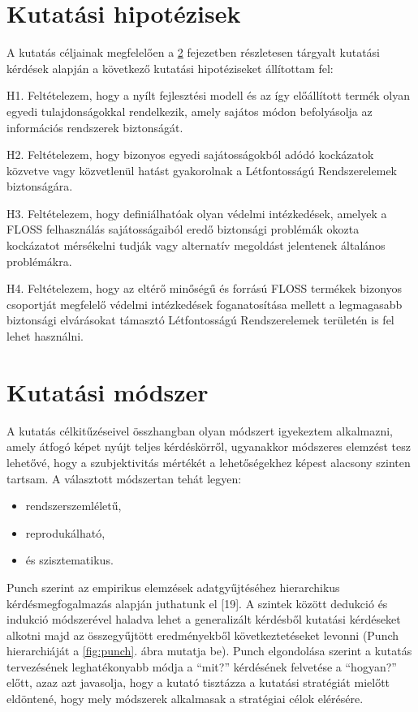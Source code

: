 \documentclass[12pt,magyar,a4paper,oneside]{scrreprt}
\providecommand{\tightlist}{%
  \setlength{\itemsep}{0pt}\setlength{\parskip}{0pt}}
\begin{document}
\hypertarget{kutatuxe1si-hipotuxe9zisek}{%
\section{Kutatási hipotézisek}\label{kutatuxe1si-hipotuxe9zisek}}

A kutatás céljainak megfelelően a \ref{sec:ResearchMethod} fejezetben
részletesen tárgyalt kutatási kérdések alapján a következő kutatási
hipotéziseket állítottam fel:

H1. Feltételezem, hogy a nyílt fejlesztési modell és az így előállított
termék olyan egyedi tulajdonságokkal rendelkezik, amely sajátos módon
befolyásolja az információs rendszerek biztonságát.

H2. Feltételezem, hogy bizonyos egyedi sajátosságokból adódó kockázatok
közvetve vagy közvetlenül hatást gyakorolnak a Létfontosságú
Rendszerelemek biztonságára.

H3. Feltételezem, hogy definiálhatóak olyan védelmi intézkedések,
amelyek a FLOSS felhasználás sajátosságaiból eredő biztonsági problémák
okozta kockázatot mérsékelni tudják vagy alternatív megoldást jelentenek
általános problémákra.

H4. Feltételezem, hogy az eltérő minőségű és forrású FLOSS termékek
bizonyos csoportját megfelelő védelmi intézkedések foganatosítása
mellett a legmagasabb biztonsági elvárásokat támasztó Létfontosságú
Rendszerelemek területén is fel lehet használni.

\hypertarget{sec:ResearchMethod}{%
\section{Kutatási módszer}\label{sec:ResearchMethod}}

A kutatás célkitűzéseivel összhangban olyan módszert igyekeztem
alkalmazni, amely átfogó képet nyújt teljes kérdéskörről, ugyanakkor
módszeres elemzést tesz lehetővé, hogy a szubjektivitás mértékét a
lehetőségekhez képest alacsony szinten tartsam. A választott módszertan
tehát legyen:

\begin{itemize}
\tightlist
\item
  rendszerszemléletű,
\item
  reprodukálható,
\item
  és szisztematikus.
\end{itemize}

Punch szerint az empirikus elemzések adatgyűjtéséhez hierarchikus
kérdésmegfogalmazás alapján juthatunk el {[}19{]}. A szintek között
dedukció és indukció módszerével haladva lehet a generalizált kérdésből
kutatási kérdéseket alkotni majd az összegyűjtött eredményekből
következtetéseket levonni (Punch hierarchiáját a \ref{fig:punch}. ábra
mutatja be). Punch elgondolása szerint a kutatás tervezésének
leghatékonyabb módja a ``mit?'' kérdésének felvetése a ``hogyan?''
előtt, azaz azt javasolja, hogy a kutató tisztázza a kutatási stratégiát
mielőtt eldöntené, hogy mely módszerek alkalmasak a stratégiai célok
elérésére.
\end{document}
